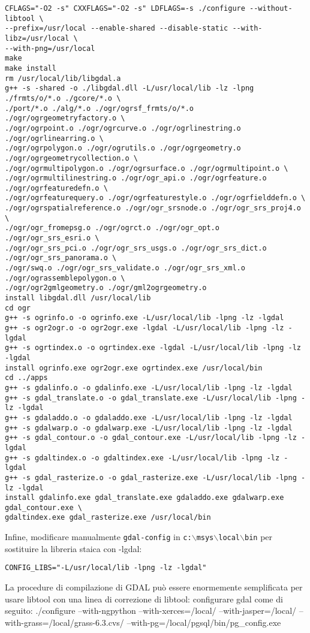 \begin{verbatim}
CFLAGS="-O2 -s" CXXFLAGS="-O2 -s" LDFLAGS=-s ./configure --without-libtool \
--prefix=/usr/local --enable-shared --disable-static --with-libz=/usr/local \
--with-png=/usr/local
make
make install
rm /usr/local/lib/libgdal.a
g++ -s -shared -o ./libgdal.dll -L/usr/local/lib -lz -lpng ./frmts/o/*.o ./gcore/*.o \
./port/*.o ./alg/*.o ./ogr/ogrsf_frmts/o/*.o ./ogr/ogrgeometryfactory.o \
./ogr/ogrpoint.o ./ogr/ogrcurve.o ./ogr/ogrlinestring.o ./ogr/ogrlinearring.o \
./ogr/ogrpolygon.o ./ogr/ogrutils.o ./ogr/ogrgeometry.o ./ogr/ogrgeometrycollection.o \
./ogr/ogrmultipolygon.o ./ogr/ogrsurface.o ./ogr/ogrmultipoint.o \
./ogr/ogrmultilinestring.o ./ogr/ogr_api.o ./ogr/ogrfeature.o ./ogr/ogrfeaturedefn.o \ 
./ogr/ogrfeaturequery.o ./ogr/ogrfeaturestyle.o ./ogr/ogrfielddefn.o \
./ogr/ogrspatialreference.o ./ogr/ogr_srsnode.o ./ogr/ogr_srs_proj4.o \
./ogr/ogr_fromepsg.o ./ogr/ogrct.o ./ogr/ogr_opt.o ./ogr/ogr_srs_esri.o \
./ogr/ogr_srs_pci.o ./ogr/ogr_srs_usgs.o ./ogr/ogr_srs_dict.o ./ogr/ogr_srs_panorama.o \
./ogr/swq.o ./ogr/ogr_srs_validate.o ./ogr/ogr_srs_xml.o ./ogr/ograssemblepolygon.o \
./ogr/ogr2gmlgeometry.o ./ogr/gml2ogrgeometry.o
install libgdal.dll /usr/local/lib
cd ogr
g++ -s ogrinfo.o -o ogrinfo.exe -L/usr/local/lib -lpng -lz -lgdal
g++ -s ogr2ogr.o -o ogr2ogr.exe -lgdal -L/usr/local/lib -lpng -lz -lgdal
g++ -s ogrtindex.o -o ogrtindex.exe -lgdal -L/usr/local/lib -lpng -lz -lgdal
install ogrinfo.exe ogr2ogr.exe ogrtindex.exe /usr/local/bin
cd ../apps
g++ -s gdalinfo.o -o gdalinfo.exe -L/usr/local/lib -lpng -lz -lgdal
g++ -s gdal_translate.o -o gdal_translate.exe -L/usr/local/lib -lpng -lz -lgdal
g++ -s gdaladdo.o -o gdaladdo.exe -L/usr/local/lib -lpng -lz -lgdal
g++ -s gdalwarp.o -o gdalwarp.exe -L/usr/local/lib -lpng -lz -lgdal
g++ -s gdal_contour.o -o gdal_contour.exe -L/usr/local/lib -lpng -lz -lgdal
g++ -s gdaltindex.o -o gdaltindex.exe -L/usr/local/lib -lpng -lz -lgdal
g++ -s gdal_rasterize.o -o gdal_rasterize.exe -L/usr/local/lib -lpng -lz -lgdal
install gdalinfo.exe gdal_translate.exe gdaladdo.exe gdalwarp.exe gdal_contour.exe \
gdaltindex.exe gdal_rasterize.exe /usr/local/bin

\end{verbatim}

Infine, modificare manualmente \texttt{gdal-config} in \texttt{c:$\backslash$msys$\backslash$local$\backslash$bin} per sostituire la libreria staica con -lgdal:

\begin{verbatim}
CONFIG_LIBS="-L/usr/local/lib -lpng -lz -lgdal"
\end{verbatim}
La procedure di compilazione di GDAL può essere enormemente semplificata per usare libtool con una linea di correzione di libtool:
configurare gdal come di seguito:
./configure --with-ngpython --with-xerces=/local/ --with-jasper=/local/ --with-grass=/local/grass-6.3.cvs/ --with-pg=/local/pgsql/bin/pg\_config.exe 

